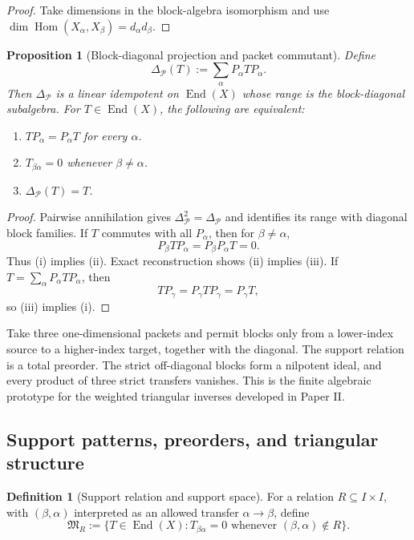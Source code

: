 \documentclass[11pt]{article}
\newtheorem{proposition}[proposition]{Proposition}
\theoremstyle{definition}
\newtheorem{definition}[definition]{Definition}
\theoremstyle{remark}
\theoremstyle{definition}\newtheorem{example}[theorem]{Example}
\newcommand{\Pcal}{\mathcal P}
\newcommand{\End}{\operatorname{End}}
\newcommand{\Hom}{\operatorname{Hom}}
\newcommand{\RecordID}[1]{\label{record:#1}}
\newcommand{\Depends}[1]{}
\newcommand{\Exports}[1]{}
\begin{document}
\begin{proof}
Take dimensions in the block-algebra isomorphism and use $\dim\Hom(X_\alpha,X_\beta)=d_\alpha d_\beta$.
\end{proof}

\begin{proposition}[Block-diagonal projection and packet commutant]
\label{prop:block-diagonal-projection}
Define
\[
\Delta_{\Pcal}(T):=\sum_{\alpha}P_\alpha TP_\alpha.
\]
Then $\Delta_{\Pcal}$ is a linear idempotent on $\End(X)$ whose range is the block-diagonal subalgebra.  For $T\in\End(X)$, the following are equivalent:
\begin{enumerate}[label=(\roman*)]
\item $TP_\alpha=P_\alpha T$ for every $\alpha$.
\item $T_{\beta\alpha}=0$ whenever $\beta\neq\alpha$.
\item $\Delta_{\Pcal}(T)=T$.
\end{enumerate}
\end{proposition}
\RecordID{PSC-I-P-BLOCK-DIAGONAL-COMMUTANT}
\Depends{PSC-I-T-OPERATOR-RECONSTRUCTION.}
\Exports{Symmetry-sector invariance and packet leakage decompositions.}

\begin{proof}
Pairwise annihilation gives $\Delta_{\Pcal}^2=\Delta_{\Pcal}$ and identifies its range with diagonal block families.  If $T$ commutes with all $P_\alpha$, then for $\beta\neq\alpha$,
\[
P_\beta TP_\alpha=P_\beta P_\alpha T=0.
\]
Thus (i) implies (ii).  Exact reconstruction shows (ii) implies (iii).  If $T=\sum_\alpha P_\alpha TP_\alpha$, then
\[
TP_\gamma=P_\gamma TP_\gamma=P_\gamma T,
\]
so (iii) implies (i).
\end{proof}

\begin{microexample}[title={Upper-triangular support}]
Take three one-dimensional packets and permit blocks only from a lower-index source to a higher-index target, together with the diagonal.  The support relation is a total preorder.  The strict off-diagonal blocks form a nilpotent ideal, and every product of three strict transfers vanishes.  This is the finite algebraic prototype for the weighted triangular inverses developed in Paper II.
\end{microexample}


\subsection{Support patterns, preorders, and triangular structure}
\begin{definition}[Support relation and support space]
\label{def:support-relation}
For a relation $R\subseteq I\times I$, with $(\beta,\alpha)$ interpreted as an allowed transfer $\alpha\to\beta$, define
\[
\mathfrak M_R
:=
\{T\in\End(X):T_{\beta\alpha}=0\text{ whenever }(\beta,\alpha)\notin R\}.
\]
\end{definition}
\RecordID{PSC-I-D-SUPPORT-RELATION}
\end{document}
